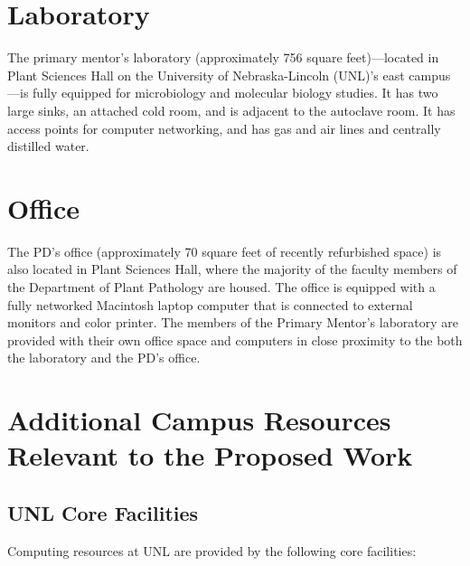 \documentclass[12pt,letterpaper]{article}
\title{\ruleline{Facilities / Other Resources}}
\begin{document}
\maketitle

\section{Laboratory}

The primary mentor's laboratory (approximately 756 square feet)---located in Plant Sciences Hall on the University of Nebraska-Lincoln (UNL)'s east campus---is fully equipped for microbiology and molecular biology studies. It has two large sinks, an attached cold room, and is adjacent to the autoclave room. It has access points for computer networking, and has gas and air lines and centrally distilled water.

\section{Office}

The PD's office (approximately 70 square feet of recently refurbished space) is also located in Plant Sciences Hall, where the majority of the faculty members of the Department of Plant Pathology are housed. The office is equipped with a fully networked Macintosh laptop computer that is connected to external monitors and color printer. The members of the Primary Mentor's laboratory are provided with their own office space and computers in close proximity to the both the laboratory and the PD's office.

\section{Additional Campus Resources Relevant to the Proposed Work}

\subsection{UNL Core Facilities}

Computing resources at UNL are provided by the following core facilities:
\end{document}
